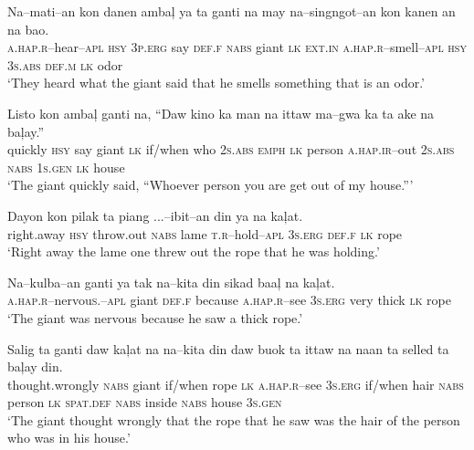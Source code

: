 \ea
\gll  Na--mati--an  kon  danen  amba\c{l}  ya  ta  ganti  na   may  na--singngot--an  kon  kanen  an  na  bao. \\
\textsc{a.hap.r}--hear--\textsc{apl}  \textsc{hsy}  3\textsc{p.erg}  say  \textsc{def.f}  \textsc{nabs}  giant  \textsc{lk}
\textsc{ext.in}  \textsc{a.hap.r}--smell--\textsc{apl}  \textsc{hsy}  3\textsc{s.abs}  \textsc{def.m}  \textsc{lk}  odor \\
\glt ‘They heard what the giant said that he smells something that is an odor.’
\z

\ea
\gll Listo  kon  amba\c{l}  ganti  na,  “Daw  kino  ka  man  na  ittaw   ma--gwa  ka  ta  ake  na  ba\c{l}ay.” \\
quickly  \textsc{hsy}  say  giant  \textsc{lk}  if/when  who  2\textsc{s.abs}  \textsc{emph}  \textsc{lk}  person
\textsc{a.hap.ir}--out  2\textsc{s.abs}  \textsc{nabs}  1\textsc{s.gen}  \textsc{lk}  house \\
\glt ‘The giant quickly said, “Whoever person you are get out of my house.”’
\z

\ea
\gll  Dayon  kon  pilak  ta  piang  ...--ibit--an  din  ya  na  ka\c{l}at. \\
right.away  \textsc{hsy}  throw.out  \textsc{nabs}  lame  \textsc{t.r}--hold--\textsc{apl}  3\textsc{s.erg}  \textsc{def.f}  \textsc{lk}  rope \\
\glt ‘Right away the lame one threw out the rope that he was holding.’
\z

\ea
\gll  Na--kulba--an  ganti  ya  tak  na--kita  din  sikad  baa\c{l}  na  ka\c{l}at. \\
\textsc{a.hap.r--}nervou\textsc{s.--apl}  giant  \textsc{def.f}  because  \textsc{a.hap.r}--see  3\textsc{s.erg}  very  thick  \textsc{lk}  rope \\
\glt ‘The giant was nervous because he saw a thick rope.’
\z

\ea
\gll  Salig  ta  ganti  daw  ka\c{l}at  na  na--kita  din  daw  buok ta  ittaw   na  naan  ta  selled  ta  ba\c{l}ay  din. \\
thought.wrongly  \textsc{nabs}  giant  if/when  rope  \textsc{lk}  \textsc{a.hap.r}--see  3\textsc{s.erg}  if/when  hair 
\textsc{nabs}  person  \textsc{lk}  \textsc{spat.def}  \textsc{nabs}  inside  \textsc{nabs}  house  3\textsc{s.gen} \\
\glt  ‘The giant thought wrongly that the rope that he saw was the hair of the person who was in his house.’
\z

